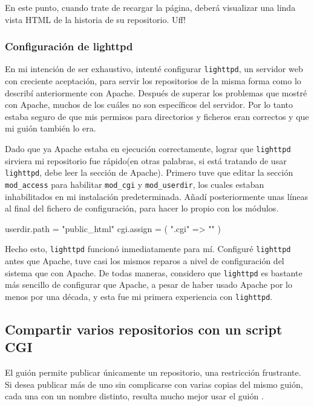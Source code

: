 En este punto, cuando trate de recargar la página, deberá visualizar
una linda vista HTML de la historia de su repositorio. Uff!

\subsubsection{Configuración de lighttpd}

En mi intención de ser exhaustivo, intenté configurar
\texttt{lighttpd}, un servidor web con creciente aceptación, para
servir los repositorios de la misma forma como lo describí
anteriormente con Apache. Después de superar los problemas que mostré
con Apache, muchos de los cuáles no son específicos del servidor.  Por
lo tanto estaba seguro de que mis permisos para directorios y ficheros
eran correctos y que mi guión  también lo era.

Dado que ya Apache estaba en ejecución correctamente, lograr que
\texttt{lighttpd} sirviera mi repositorio fue rápido(en otras
palabras, si está tratando de usar \texttt{lighttpd}, debe leer la
sección de Apache).  Primero tuve que editar la sección
\texttt{mod\_access} para habilitar \texttt{mod\_cgi} y
\texttt{mod\_userdir}, los cuales estaban inhabilitados en mi
instalación predeterminada.  Añadí posteriormente unas líneas al final
del fichero de configuración, para hacer lo propio con los módulos.
\begin{codesample2}
  userdir.path = "public_html"
  cgi.assign = ( ".cgi" => "" )
\end{codesample2}
Hecho esto, \texttt{lighttpd} funcionó inmediatamente para
mí. Configuré \texttt{lighttpd} antes que Apache, tuve casi los mismos
reparos a nivel de configuración del sistema que con Apache.  De todas
maneras, considero que \texttt{lighttpd} es bastante más sencillo de
configurar que Apache, a pesar de haber usado Apache por lo menos por
una década, y esta fue mi primera experiencia con \texttt{lighttpd}.

\subsection{Compartir varios repositorios con un script CGI}

El guión  permite publicar únicamente un
repositorio, una restricción frustrante.  Si desea publicar más de uno
sin complicarse con varias copias del mismo guión, cada una con un
nombre distinto, resulta mucho mejor usar el guión
.

